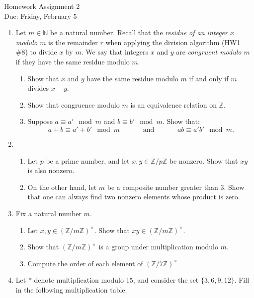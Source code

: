 \documentclass[11pt]{article}
\newcommand{\bN}{\mathbb{N}}
\newcommand{\bZ}{\mathbb{Z}}
\begin{document}
\begin{center}
	\Large {Homework Assignment 2}\\
	\small {Due: Friday, February 5}
\end{center}
\begin{enumerate}
    \item{
    Let $m\in\bN$ be a natural number.  Recall that the \textit{residue of an integer $x$ modulo $m$} is the remainder $r$ when applying the division algorithm (HW1 \#8) to divide $x$ by $m$.  We say that integers $x$ and $y$ are \textit{congruent modulo $m$} if they have the same residue modulo $m$.
    \begin{enumerate}
  	\item{
      Show that $x$ and $y$ have the same residue modulo $m$ if and only if $m$ divides $x-y$.
    	}
      \item{
      Show that congruence modulo $m$ is an equivalence relation on $\bZ$.
  	  }
      \item{
      Suppose $a\equiv a'\mod m$ and $b\equiv b'\mod m$.  Show that:
      \[a+b\equiv a'+b'\mod m\hspace{40pt}\text{and}\hspace{40pt}ab\equiv a'b'\mod m.\]
      }
    \end{enumerate}
    }
  \item{
    \begin{enumerate}
      \item{
      Let $p$ be a prime number, and let $x,y\in\bZ/p\bZ$ be nonzero.  Show that $xy$ is also nonzero.
      }
      \item{
      On the other hand, let $m$ be a composite number greater than 3.  Show that one can always find two nonzero elements whose product is zero.
      }
    \end{enumerate}
  }
  \item{
  Fix a natural number $m$.
  \begin{enumerate}
  	\item{
    Let $x,y\in(\bZ/m\bZ)^\times$.  Show that $xy\in(\bZ/m\bZ)^\times$.
    }
  	\item{
    Show that $(\bZ/m\bZ)^\times$ is a group under multiplication modulo $m$.
    }
  	\item{
    Compute the order of each element of $(\bZ/7\bZ)^\times$
    }
  \end{enumerate}
  }
	\item Let $*$ denote multiplication modulo 15, and consider the set $\{3,6,9,12\}$.  Fill in the following multiplication table.

\end{enumerate}
\end{document}
